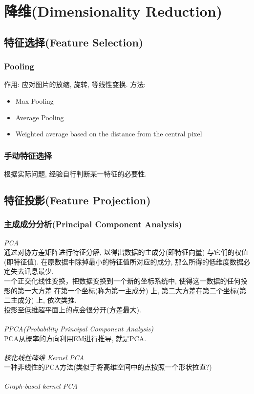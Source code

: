 \documentclass[oneside]{book}
\begin{document}
		\section{降维(Dimensionality Reduction)}
			\subsection{特征选择(Feature Selection)}
				\subsubsection{Pooling}
					作用: 应对图片的放缩, 旋转, 等线性变换.
					方法:
					\begin{itemize}
						\item Max Pooling
						\item Average Pooling
						\item Weighted average based on the distance from the central pixel
					\end{itemize}
				\subsubsection{手动特征选择}
					根据实际问题, 经验自行判断某一特征的必要性.
			\subsection{特征投影(Feature Projection)}
				\subsubsection{主成成分分析(Principal Component Analysis)}
					\emph{PCA}\\
					通过对协方差矩阵进行特征分解, 以得出数据的主成分(即特征向量) 与它们的权值(即特征值).
					在原数据中除掉最小的特征值所对应的成分, 那么所得的低维度数据必定失去讯息最少.\\
					一个正交化线性变换，把数据变换到一个新的坐标系统中, 使得这一数据的任何投影的第一大方差
					在第一个坐标(称为第一主成分) 上, 第二大方差在第二个坐标(第二主成分) 上, 依次类推.\\ 
					投影至低维超平面上的点会很分开(方差最大).\\ \\
					\emph{PPCA(Probability Principal Component Analysis)}\\
					PCA从概率的方向利用EM进行推导, 就是PCA. \\ \\
					\emph{核化线性降维 Kernel PCA}\\
					一种非线性的PCA方法(类似于将高维空间中的点按照一个形状拉直?)\\ \\
					\emph{Graph-based kernel PCA}\\
\end{document}
